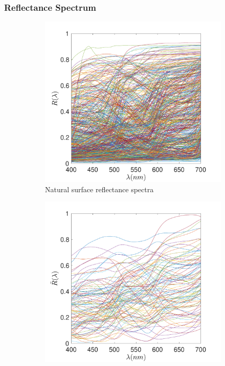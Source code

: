 \documentclass{jov}
\begin{document}
\subsubsection{Reflectance Spectrum}
\begin{figure}
\centering
	\begin{subfigure}[b]{0.3 \textwidth}
    \centering
        \includegraphics[width=\textwidth]{../Figures/Figure13/Figure13_a.pdf}
        \caption{Natural surface reflectance spectra}
        \label{fig:naturalSurface}
    \end{subfigure}
    \begin{subfigure}[b]{0.3\textwidth}
    \centering
        \includegraphics[width=\textwidth]{../Figures/Figure13/Figure13_b.pdf}

\end{subfigure}
\end{figure}
\end{document}

